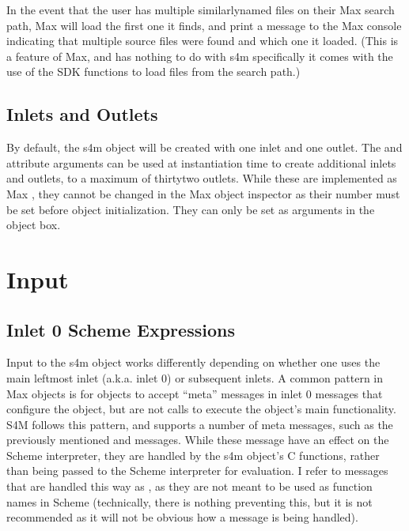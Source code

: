 \documentclass[letterpaper,10pt,english]{sphinxmanual}
\begin{document}
\sphinxAtStartPar
In the event that the user has multiple similarly\sphinxhyphen{}named files on their Max search path, Max will load the first one it finds,
and print a message to the Max console indicating that multiple source files were found and which one it loaded.
(This is a feature of Max, and has nothing to do with s4m specifically \sphinxhyphen{} it comes with the use of the SDK functions to
load files from the search path.)


\subsection{Inlets and Outlets}
\label{\detokenize{features_usage:inlets-and-outlets}}
\sphinxAtStartPar
By default, the s4m object will be created with one inlet and one outlet.
The  and  attribute arguments can be used at instantiation time to create additional inlets and outlets,
to a maximum of thirty\sphinxhyphen{}two outlets.
While these are implemented as Max , they cannot be changed in the Max object inspector as their number must be set
before object initialization. They can only be set as  arguments in the object box.


\section{Input}
\label{\detokenize{features_usage:input}}

\subsection{Inlet 0 Scheme Expressions}
\label{\detokenize{features_usage:inlet-0-scheme-expressions}}
\sphinxAtStartPar
Input to the s4m object works differently depending on whether one uses the main left\sphinxhyphen{}most inlet (a.k.a. inlet 0) or subsequent inlets.
A common pattern in Max objects is for objects to accept “meta” messages in inlet 0 \sphinxhyphen{} messages that configure the object,
but are not calls to execute the object’s main functionality.
S4M follows this pattern, and supports a number of meta messages, such as the previously mentioned  and  messages.
While these message have an effect on the Scheme interpreter, they are handled by the s4m object’s C functions,
rather than being passed to the Scheme interpreter for evaluation.
I refer to messages that are handled this way as , as they are not meant to be used
as function names in Scheme (technically, there is nothing preventing this, but it is not recommended
as it will not be obvious how a message is being handled).
\end{document}

